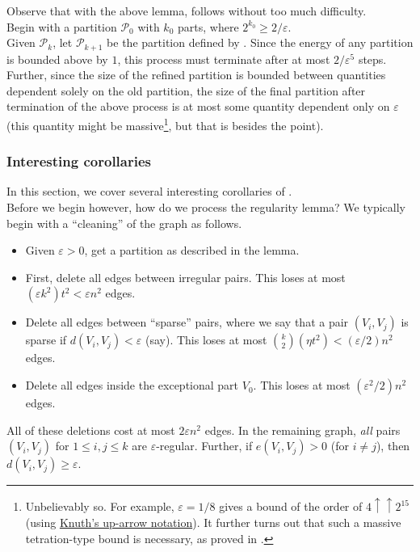 			Observe that with the above lemma,  follows without too much difficulty.\\
			Begin with a partition $\mathcal{P}_0$ with $k_0$ parts, where $2^{k_0} \ge 2/\varepsilon$.\\
			Given $\mathcal{P}_k$, let $\mathcal{P}_{k+1}$ be the partition defined by . Since the energy of any partition is bounded above by $1$, this process must terminate after at most $2/\varepsilon^5$ steps.\\
			Further, since the size of the refined partition is bounded between quantities dependent solely on the old partition, the size of the final partition after termination of the above process is at most some quantity dependent only on $\varepsilon$ (this quantity might be massive\footnote{Unbelievably so. For example, $\varepsilon=1/8$ gives a bound of the order of $4\uparrow\uparrow 2^{15}$ (using \href{https://en.wikipedia.org/wiki/Knuths_up-arrow_notation}{Knuth's up-arrow notation}). It further turns out that such a massive tetration-type bound is necessary, as proved in \cite{Gowers1997}.}, but that is besides the point).\\

		\subsubsection{Interesting corollaries}

			In this section, we cover several interesting corollaries of .\\

			Before we begin however, how do we process the regularity lemma? We typically begin with a ``cleaning'' of the graph as follows.
			\begin{itemize}
				\item Given $\varepsilon > 0$, get a partition as described in the lemma.
				\item First, delete all edges between irregular pairs. This loses at most $(\varepsilon k^2) t^2 < \varepsilon n^2$ edges.
				\item Delete all edges between ``sparse'' pairs, where we say that a pair $(V_i,V_j)$ is sparse if $d(V_i,V_j) < \varepsilon$ (say). This loses at most $\binom{k}{2} (\eta t^2) < (\varepsilon/2)n^2$ edges.
				\item Delete all edges inside the exceptional part $V_0$. This loses at most $(\varepsilon^2/2)n^2$ edges. 
			\end{itemize}
			All of these deletions cost at most $2\varepsilon n^2$ edges. In the remaining graph, \emph{all} pairs $(V_i,V_j)$ for $1 \le i,j\le k$ are $\varepsilon$-regular. Further, if $e(V_i,V_j) > 0$ (for $i\ne j$), then $d(V_i,V_j) \ge \varepsilon$.\\

